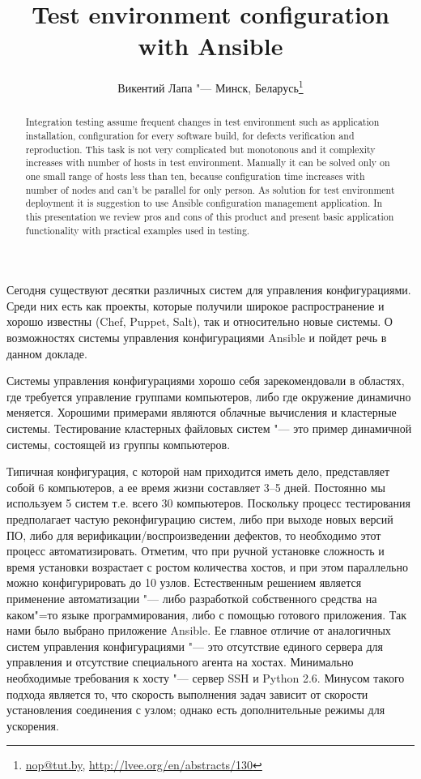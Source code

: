 \documentclass[10pt, a5paper]{article}
\begin{document}
\title{Test environment configuration with Ansible}
\author{Викентий Лапа "--- Минск, Беларусь\footnote{\url{nop@tut.by}, \url{http://lvee.org/en/abstracts/130}}}
\maketitle
\begin{abstract}
Integration testing assume frequent changes in test environment such as application installation, configuration for every software build, for defects verification and reproduction. This task is not very complicated but monotonous and it complexity increases with number of hosts in test environment. Manually it can be solved only on one small range of hosts less than ten, because configuration time increases with number of nodes and can't be parallel for only person. As solution for test environment deployment it is suggestion to use Ansible configuration management application. In this presentation we review pros and cons of this product and present basic application functionality with practical examples used in testing. 
\end{abstract}
Сегодня существуют десятки различных систем для управления конфигурациями. Среди них есть как проекты, которые получили широкое распространение и хорошо известны (Chef, Puppet, Salt), так и относительно новые системы. О возможностях системы управления конфигурациями Ansible и пойдет речь в данном докладе.

Системы управления конфигурациями хорошо себя зарекомендовали в областях, где требуется управление группами компьютеров, либо где окружение динамично меняется. Хорошими примерами являются облачные вычисления и кластерные системы. Тестирование кластерных файловых систем "--- это пример динамичной системы, состоящей из группы компьютеров.

Типичная конфигурация, с которой нам приходится иметь дело, представляет собой 6 компьютеров, а ее время жизни составляет 3--5 дней. Постоянно мы используем 5 систем т.е. всего 30 компьютеров. Поскольку процесс тестирования предполагает частую реконфигурацию систем, либо при выходе новых версий ПО, либо для верификации/воспроизведении дефектов, то необходимо этот процесс автоматизировать. Отметим, что при ручной установке сложность и время установки возрастает с ростом количества хостов, и при этом параллельно можно конфигурировать до 10 узлов. Естественным решением является применение автоматизации "--- либо разработкой собственного средства на каком"=то языке программирования, либо с помощью готового приложения. Так нами было выбрано приложение Ansible. Ее главное отличие от аналогичных систем управления конфигурациями "--- это отсутствие единого сервера для управления и отсутствие специального агента на хостах. Минимально необходимые требования к хосту "--- сервер SSH и Python 2.6. Минусом такого подхода является то, что скорость выполнения задач зависит от скорости установления соединения с узлом; однако есть дополнительные режимы для ускорения.
\end{document}
